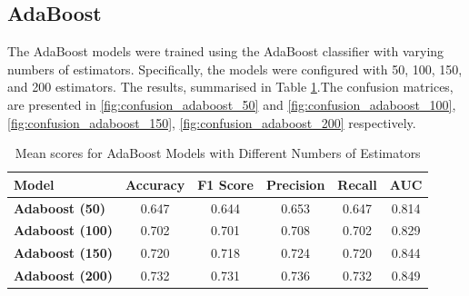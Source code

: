 \subsection*{AdaBoost}
The AdaBoost models were trained using the AdaBoost classifier with varying numbers of estimators. Specifically, the models were configured with 50, 100, 150, and 200 estimators. The results, summarised in Table \ref{tab:adaboost_scores}.The confusion matrices, are presented in \autoref{fig:confusion_adaboost_50} and \autoref{fig:confusion_adaboost_100}, \autoref{fig:confusion_adaboost_150}, \autoref{fig:confusion_adaboost_200} respectively.


\begin{table}[H]
    \centering
    \begin{tabular}{|p{5cm}|c|c|c|c|c|}
    \hline
    \textbf{Model} & \textbf{Accuracy} & \textbf{F1 Score} & \textbf{Precision} & \textbf{Recall} & \textbf{AUC} \\ \hline
    \textbf{Adaboost (50)} & 0.647 & 0.644 & 0.653 & 0.647 & 0.814 \\
    \textbf{Adaboost (100)} & 0.702 & 0.701 & 0.708 & 0.702 & 0.829 \\
    \textbf{Adaboost (150)} & 0.720 & 0.718 & 0.724 & 0.720 & 0.844 \\
    \textbf{Adaboost (200)} & 0.732 & 0.731 & 0.736 & 0.732 & 0.849 \\ \hline
    \end{tabular}
    \caption{Mean scores for AdaBoost Models with Different Numbers of Estimators}
    \label{tab:adaboost_scores}
    \end{table}
    
